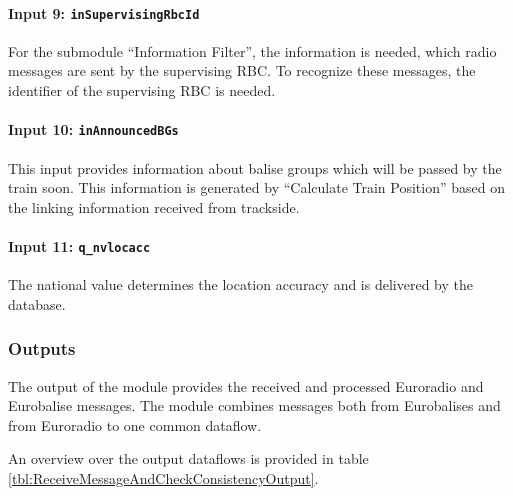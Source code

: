 \paragraph{Input 9: \texttt{inSupervisingRbcId}}
For the submodule ``Information Filter'', the information is needed, which radio messages are sent by the supervising RBC. To recognize these messages, the identifier of the supervising RBC is needed.

\paragraph{Input 10: \texttt{inAnnouncedBGs}}
This input provides information about balise groups which will be passed by the train soon. This information is generated by ``Calculate Train Position'' based on the linking information received from trackside.

\paragraph{Input 11: \texttt{q\_nvlocacc}}
The national value determines the location accuracy and is delivered by the database.



\subsubsection{Outputs}
The output of the module provides the received and processed Euroradio and Eurobalise messages. The module combines messages both from Eurobalises and from Euroradio to one common dataflow.

An overview over the output dataflows is provided in table \ref{tbl:ReceiveMessageAndCheckConsistencyOutput}.

